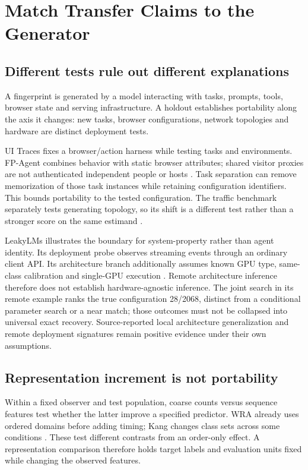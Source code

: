 \section{Match Transfer Claims to the Generator}\label{sec:evaluation}\label{sec:threats}
\subsection{Different tests rule out different explanations}
A fingerprint is generated by a model interacting with tasks, prompts, tools, browser state and serving infrastructure. A holdout establishes portability along the axis it changes: new tasks, browser configurations, network topologies and hardware are distinct deployment tests.

UI Traces fixes a browser/action harness while testing tasks and environments. FP-Agent combines behavior with static browser attributes; shared visitor proxies are not authenticated independent people or hosts \cite{uitraces2026,wang2026fpagent}. Task separation can remove memorization of those task instances while retaining configuration identifiers. This bounds portability to the tested configuration. The traffic benchmark separately tests generating topology, so its shift is a different test rather than a stronger score on the same estimand \cite{pouryousef2026traffic}.

LeakyLMs illustrates the boundary for system-property rather than agent identity. Its deployment probe observes streaming events through an ordinary client API. Its architecture branch additionally assumes known GPU type, same-class calibration and single-GPU execution \cite{majidi2026leakylms}. Remote architecture inference therefore does not establish hardware-agnostic inference. The joint search in its remote example ranks the true configuration 28/2068, distinct from a conditional parameter search or a near match; those outcomes must not be collapsed into universal exact recovery. Source-reported local architecture generalization and remote deployment signatures remain positive evidence under their own assumptions.

\subsection{Representation increment is not portability}
Within a fixed observer and test population, coarse counts versus sequence features test whether the latter improve a specified predictor. WRA already uses ordered domains before adding timing; Kang changes class sets across some conditions \cite{jeong2026wra,kang2026whoseagent}. These test different contrasts from an order-only effect. A representation comparison therefore holds target labels and evaluation units fixed while changing the observed features.

